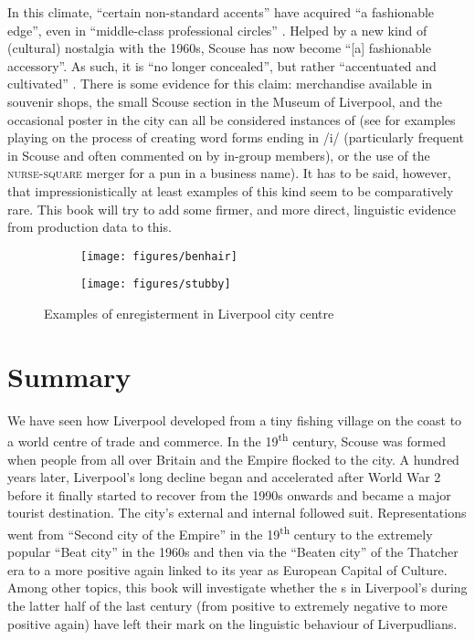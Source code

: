 In this climate, ``certain non-standard accents'' have acquired ``a fashionable edge'', even in ``middle-class professional circles'' \parencite[58]{belchem2006d}.
Helped by a new kind of (cultural) nostalgia with the 1960s, Scouse has now become ``[a] fashionable accessory''.
As such, it is ``no longer concealed'', but rather ``accentuated and cultivated'' \citep[58]{belchem2006d}.
There is some evidence for this claim: merchandise available in souvenir shops, the small Scouse section in the Museum of Liverpool, and the occasional poster in the city can all be considered instances of  (see  for examples playing on the process of creating word forms ending in /i/ (particularly frequent in Scouse and often commented on by in-group members), or the use of the \textsc{nurse}-\textsc{square} merger for a pun in a business name).
It has to be said, however, that impressionistically at least examples of this kind seem to be comparatively rare.
This book will try to add some firmer, and more direct, linguistic evidence from production data to this.

	\begin{figure}
		
			\begin{subfigure}[h]{0.45\textwidth}
				
				\texttt{[image: figures/benhair]}
			\end{subfigure}
			\begin{subfigure}[h]{0.45\textwidth}
				
				\texttt{[image: figures/stubby]}
			\end{subfigure}
		\caption{Examples of enregisterment in Liverpool city centre}
		\label{fig.posters}
	\end{figure}

\section{Summary}\label{sec.hist.con}

We have seen how Liverpool developed from a tiny fishing village on the  coast to a world centre of trade and commerce.
In the 19\textsuperscript{th} century, Scouse was formed when people from all over Britain and the Empire flocked to the city.
A hundred years later, Liverpool's long decline began and accelerated after World War 2 before it finally started to recover from the 1990s onwards and became a major tourist destination.
The city's external and internal  followed suit.
Representations went from ``Second city of the Empire'' in the 19\textsuperscript{th} century to the extremely popular ``Beat city'' in the 1960s and then via the ``Beaten city'' of the Thatcher era to a more positive  again linked to its year as European Capital of Culture.
Among other topics, this book will investigate whether the s in Liverpool's  during the latter half of the last century (from positive to extremely negative to more positive again) have left their mark on the linguistic behaviour of Liverpudlians.